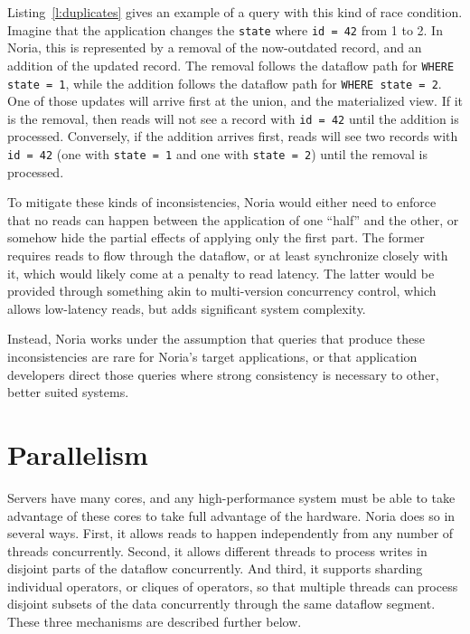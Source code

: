 Listing~\vref{l:duplicates} gives an example of a query with this kind of race
condition. Imagine that the application changes the \texttt{state} where
\texttt{id = 42} from 1 to 2. In Noria, this is represented by a removal of the
now-outdated record, and an addition of the updated record. The removal follows
the dataflow path for \texttt{WHERE state = 1}, while the addition follows the
dataflow path for \texttt{WHERE state = 2}. One of those updates will arrive
first at the union, and the materialized view. If it is the removal, then reads
will not see a record with \texttt{id = 42} until the addition is processed.
Conversely, if the addition arrives first, reads will see two records with
\texttt{id = 42} (one with \texttt{state = 1} and one with \texttt{state = 2})
until the removal is processed.

To mitigate these kinds of inconsistencies, Noria would either need to enforce
that no reads can happen between the application of one ``half'' and the other,
or somehow hide the partial effects of applying only the first part. The former
requires reads to flow through the dataflow, or at least synchronize closely
with it, which would likely come at a penalty to read latency. The latter would
be provided through something akin to multi-version concurrency control, which
allows low-latency reads, but adds significant system complexity.

Instead, Noria works under the assumption that queries that produce these
inconsistencies are rare for Noria's target applications, or that application
developers direct those queries where strong consistency is necessary to other,
better suited systems.

\section{Parallelism}
\label{s:parallel}

Servers have many cores, and any high-performance system must be able to take
advantage of these cores to take full advantage of the hardware. Noria does so
in several ways. First, it allows reads to happen independently from any number
of threads concurrently. Second, it allows different threads to process writes
in disjoint parts of the dataflow concurrently. And third, it supports sharding
individual operators, or cliques of operators, so that multiple threads can
process disjoint subsets of the data concurrently through the same dataflow
segment. These three mechanisms are described further below.

